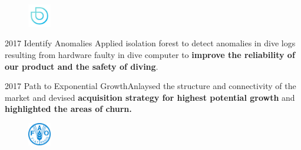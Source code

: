 \documentclass{tccv}
\begin{document}
\begin{figure}[h!] %
  \centering
  \includegraphics[width=1cm,height=1cm]{../company_icon/deepblu.jpg}
\end{figure}

\begin{yearlist}

  \item{2017} {Identify Anomalies} {Applied isolation forest to detect
    anomalies in dive logs resulting from hardware faulty in dive
    computer to \textbf{improve the reliability of our product and the
      safety of diving}.}

  \item{2017} {Path to Exponential Growth}{Anlaysed the structure and
    connectivity of the market and devised \textbf{acquisition
      strategy for highest potential growth} and \textbf{highlighted
      the areas of churn.}}
    
\end{yearlist}


\begin{figure}[h!] %
  \centering
  \includegraphics[width=1cm,height=1cm]{../company_icon/fao.png}
\end{figure}
\end{document}
